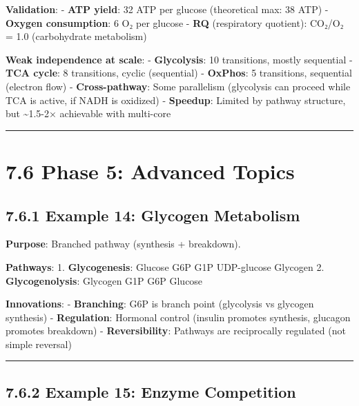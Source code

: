 \textbf{Validation}: - \textbf{ATP yield}: 32 ATP per glucose
(theoretical max: 38 ATP) - \textbf{Oxygen consumption}: 6 O₂ per
glucose - \textbf{RQ} (respiratory quotient): CO₂/O₂ = 1.0 (carbohydrate
metabolism)

\textbf{Weak independence at scale}: - \textbf{Glycolysis}: 10
transitions, mostly sequential - \textbf{TCA cycle}: 8 transitions,
cyclic (sequential) - \textbf{OxPhos}: 5 transitions, sequential
(electron flow) - \textbf{Cross-pathway}: Some parallelism (glycolysis
can proceed while TCA is active, if NADH is oxidized) -
\textbf{Speedup}: Limited by pathway structure, but
\textasciitilde1.5-2× achievable with multi-core

\begin{center}\rule{0.5\linewidth}{0.5pt}\end{center}

\hypertarget{phase-5-advanced-topics}{%
\section{7.6 Phase 5: Advanced Topics}\label{phase-5-advanced-topics}}

\hypertarget{example-14-glycogen-metabolism}{%
\subsection{7.6.1 Example 14: Glycogen
Metabolism}\label{example-14-glycogen-metabolism}}

\textbf{Purpose}: Branched pathway (synthesis + breakdown).

\textbf{Pathways}: 1. \textbf{Glycogenesis}: Glucose \textrightarrow G6P \textrightarrow G1P \textrightarrow
UDP-glucose \textrightarrow Glycogen 2. \textbf{Glycogenolysis}: Glycogen \textrightarrow G1P \textrightarrow G6P
\textrightarrow Glucose

\textbf{Innovations}: - \textbf{Branching}: G6P is branch point
(glycolysis vs glycogen synthesis) - \textbf{Regulation}: Hormonal
control (insulin promotes synthesis, glucagon promotes breakdown) -
\textbf{Reversibility}: Pathways are reciprocally regulated (not simple
reversal)

\begin{center}\rule{0.5\linewidth}{0.5pt}\end{center}

\hypertarget{example-15-enzyme-competition}{%
\subsection{7.6.2 Example 15: Enzyme
Competition}\label{example-15-enzyme-competition}}

